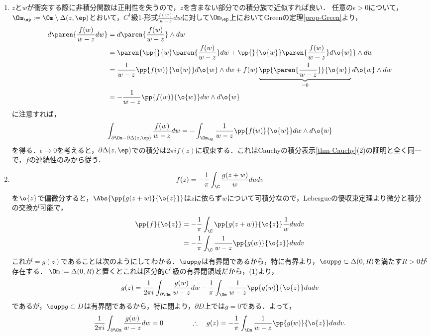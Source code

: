 \documentclass[uplatex, dvipdfmx]{jsreport}
\begin{document}
\begin{Proof}\mbox{}
    \begin{enumerate}
        \item $z$と$w$が衝突する際に非積分関数は正則性を失うので，$z$を含まない部分での積分族で近似すれば良い．
        任意の$\epsilon>0$について，$\Om_\ep:=\Om\setminus\Delta(z,\ep)$とおいて，$C^1$級1-形式$\frac{f(w)}{w-z}dw$に対して$\Om_\ep$上においてGreenの定理\ref{prop-Green}より，
        \begin{align*}
            d\paren{\frac{f(w)}{w-z}dw}&=d\paren{\frac{f(w)}{w-z}}\wedge dw\\
            &=\paren{\pp{}{w}\paren{\frac{f(w)}{w-z}}dw+\pp{}{\o{w}}\paren{\frac{f(w)}{w-z}}d\o{w}}\wedge dw\\
            &=\frac{1}{w-z}\pp{f(w)}{\o{w}}d\o{w}\wedge dw+f(w)\underbrace{\pp{\paren{\frac{1}{w-z}}}{\o{w}}}_{=0}d\o{w}\wedge dw\\
            &=-\frac{1}{w-z}\pp{f(w)}{\o{w}}dw\wedge d\o{w}
        \end{align*}
        に注意すれば，
        \[\int_{\partial\Om-\partial\Delta(z,\ep)}\frac{f(w)}{w-z}dw=-\int_{\Om_\ep}\frac{1}{w-z}\pp{f(w)}{\o{w}}dw\wedge d\o{w}\]
        を得る．$\epsilon\to0$を考えると，$\partial\Delta(z,\ep)$での積分は$2\pi if(z)$に収束する．これはCauchyの積分表示\ref{thm-Cauchy}(2)の証明と全く同一で，$f$の連続性のみから従う．
        \item 
        \[f(z)=-\frac{1}{\pi}\int_\C\frac{g(z+w)}{w}dudv\]
        を$\o{z}$で偏微分すると，$\Abs{\pp{g(z+w)}{\o{z}}}$は$z$に依らず$w$について可積分なので，Lebesgueの優収束定理より微分と積分の交換が可能で，
        \begin{align*}
            \pp{f}{\o{z}}&=-\frac{1}{\pi}\int_\C\pp{g(z+w)}{\o{z}}\frac{1}{w}dudv\\
            &=-\frac{1}{\pi}\int_\C\frac{1}{w-z}\pp{g(w)}{\o{z}}dudv
        \end{align*}
        これが$=g(z)$であることは次のようにしてわかる．$\supp g$は有界閉であるから，特に有界より，$\supp g\subset\Delta(0,R)$を満たす$R>0$が存在する．
        $\Om:=\Delta(0,R)$と置くとこれは区分的$C^1$級の有界閉領域だから，(1)より，
        \[g(z)=\frac{1}{2\pi i}\int_{\partial\Om}\frac{g(w)}{w-z}dw-\frac{1}{\pi}\int_\Om\frac{1}{w-z}\pp{g(w)}{\o{z}}dudv\]
        であるが，$\supp g\subset D$は有界閉であるから，特に閉より，$\partial D$上では$g=0$である．よって，
        \[\frac{1}{2\pi i}\int_{\partial\Om}\frac{g(w)}{w-z}dw=0\qquad\qquad\therefore\quad g(z)=-\frac{1}{\pi}\int_\Om\frac{1}{w-z}\pp{g(w)}{\o{z}}dudv.\]
    \end{enumerate}
\end{Proof}
\end{document}
